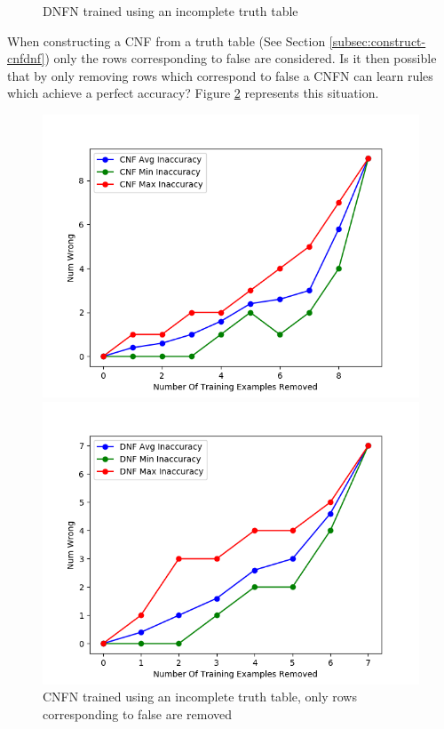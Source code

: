 \begin{figure}[H]
\begin{minipage}[b]{0.45\textwidth}
		\caption{DNFN trained using an incomplete truth table}
		\label{fig:dnf-descrete-generalizatiion}
	\end{minipage}
	\hfill
\end{figure}

When constructing a CNF from a truth table (See Section \ref{subsec:construct-cnfdnf}) only the rows corresponding to false are considered. Is it then possible that by only removing rows which correspond to false a CNFN can learn rules which achieve a perfect accuracy? Figure \ref{fig:cnf-descrete-generalizatiion-partial} represents this situation.

\begin{figure}[H]
	\centering
	\begin{minipage}[b]{0.45\textwidth}
		\includegraphics[width=\textwidth]{cnf-descrete-generalization-partial.png}
		\caption{CNFN trained using an incomplete truth table, only rows corresponding to false are removed}
		\label{fig:cnf-descrete-generalizatiion-partial}
	\end{minipage}
	\begin{minipage}[b]{0.45\textwidth}
		\includegraphics[width=\textwidth]{dnf-descrete-generalization-partial.png}

\end{minipage}
\end{figure}

